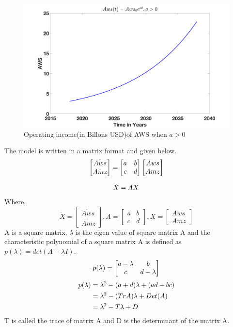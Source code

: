 \documentclass[fleqn,10pt]{SelfArx} %
\begin{document}
\begin{figure}[ht]\centering
\includegraphics[width=\linewidth]{awsincome2}
\caption{Operating income(in Billons USD)of AWS when $a > 0$}
\label{fig:awsincome2}
\end{figure}

The model is written in a matrix format and given below.
\[
\centering
\begin{bmatrix} 
\dot{Aws} \\
\dot{Amz}
\end{bmatrix}
=
\begin{bmatrix}
a & b \\
c & d
\end{bmatrix}
\begin{bmatrix}
Aws\\
Amz
\end{bmatrix}
\]

\begin{equation} \centering
\dot{X} = AX
\label{eq:mateqe}
\end{equation}
Where,
\[
\dot{X} =
\begin{bmatrix}
\dot{Aws} \\
\dot{Amz}
\end{bmatrix}
,A=
\begin{bmatrix}
a & b \\
c & d
\end{bmatrix}
,X=
\begin{bmatrix}
Aws\\
Amz
\end{bmatrix}
\]
A is a square matrix, $\lambda$ is the eigen value of square matrix A and the characteristic polynomial of a square matrix A is defined as $p(\lambda) = det(A-\lambda I)$. 
\[
\centering
p(\lambda) =
\begin{bmatrix} 
a - \lambda & b \\
c & d - \lambda
\end{bmatrix}
\]
\begin{equation} \centering
\begin{split}
p(\lambda) & = \lambda^2 - (a + d)\lambda + (ad - bc) \\
&= \lambda^2 - (Tr A)\lambda + Det(A) \\
&= \lambda^2 - T\lambda + D
\end{split}
\label{eq:lambda1}
\end{equation}
T is called the trace of matrix A and D is the determinant of the matrix A.
\end{document}
